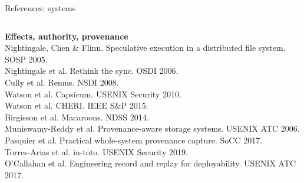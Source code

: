 \begin{frame}[t]{References: systems}
{\begin{columns}[T,onlytextwidth]
\textbf{Effects, authority, provenance}\\
Nightingale, Chen \& Flinn. Speculative execution in a distributed file system. SOSP 2005.\\
Nightingale et al. Rethink the sync. OSDI 2006.\\
Cully et al. Remus. NSDI 2008.\\
Watson et al. Capsicum. USENIX Security 2010.\\
Watson et al. CHERI. IEEE S\&P 2015.\\
Birgisson et al. Macaroons. NDSS 2014.\\
Muniswamy-Reddy et al. Provenance-aware storage systems. USENIX ATC 2006.\\
Pasquier et al. Practical whole-system provenance capture. SoCC 2017.\\
Torres-Arias et al. in-toto. USENIX Security 2019.\\
O'Callahan et al. Engineering record and replay for deployability. USENIX ATC 2017.
\end{columns}\par}
\end{frame}

